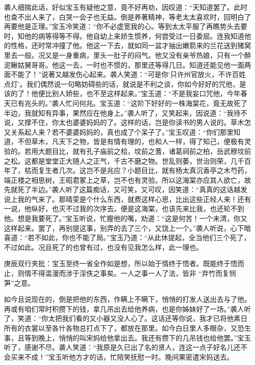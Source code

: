 \begin{parag}
    袭人细揣此话，好似宝玉有疑他之意，竟不好再劝，因叹道：“天知道罢了。此时也查不出人来了，白哭一会子也无益。倒是养著精神，等老太太喜欢时，回明白了再要他是正理。”宝玉冷笑道：“你不必虚宽我的心。等到太太平服了再瞧势头去要时，知他的病等得等不得。他自幼上来娇生惯养，何尝受过一日委屈。连我知道他的性格，还时常冲撞了他。他这一下去，就如同一盆才抽出嫩箭来的兰花送到猪窝里去一般。况又是一身重病，里头一肚子的闷气。他又没有亲爷热娘，只有一个醉泥鳅姑舅哥哥。他这一去，一时也不惯的，那里还等得几日。知道还能见他一面两面不能了！”说著又越发伤心起来。袭人笑道：“可是你‘只许州官放火，不许百姓点灯’。我们偶然说一句略妨碍些的话，就说是不利之谈，你如今好好的咒他，是该的了！他便比别人娇些，也不至这样起来。”宝玉道：“不是我妄口咒他，今年春天已有兆头的。”袭人忙问何兆。宝玉道：“这阶下好好的一株海棠花，竟无故死了半边，我就知有异事，果然应在他身上。”袭人听了，又笑起来，因说道：“我待不说，又撑不住，你太也婆婆妈妈的了。这样的话，岂是你读书的男人说的。草木怎又关系起人来？若不婆婆妈妈的，真也成了个呆子了。”宝玉叹道：“你们那里知道，不但草木，凡天下之物，皆是有情有理的，也和人一样，得了知己，便极有灵验的。若用大题目比，就有孔子庙前之桧，坟前之蓍，诸葛祠前之柏，岳武穆坟前之松。这都是堂堂正大随人之正气，千古不磨之物。世乱则萎，世治则荣，几千百年了，枯而复生者几次。这岂不是兆应？小题目比，就有杨太真沉香亭之木芍药，端正楼之相思树，王昭君冢上之草，岂不也有灵验。所以这海棠亦应其人欲亡，故先就死了半边。”袭人听了这篇痴话，又可笑，又可叹，因笑道：“真真的这话越发说上我的气来了。那晴雯是个什么东西，就费这样心思，比出这些正经人来！还有一说，他纵好，也灭不过我的次序去。便是这海棠，也该先来比我，也还轮不到他。想是我要死了。”宝玉听说，忙握他的嘴，劝道：“这是何苦！一个未清，你又这样起来。罢了，再别提这事，别弄的去了三个，又饶上一个。”袭人听说，心下暗喜道：“若不如此，你也不能了局。”宝玉乃道：“从此休提起，全当他们三个死了，不过如此。况且死了的也曾有过，也没有见我怎么样，此一理也。\begin{note}庚辰双行夹批：宝玉至终一省全作如是想，所以始于情终于悟者。既能终于悟而止，则情不得滥漫而涉于淫佚之事矣。一人之事一人了法，皆非 “弃竹而复悯笋”之意。\end{note}如今且说现在的，倒是把他的东西，作瞒上不瞒下，悄悄的打发人送出去与了他。再或有咱们常时积攒下的钱，拿几吊出去给他养病，也是你姊妹好了一场。”袭人听了，笑道：“你太把我们看的又小器又没人心了。这话还等你说，我才已将他素日所有的衣裳以至各什各物总打点下了，都放在那里。如今白日里人多眼杂，又恐生事，且等到晚上，悄悄的叫宋妈给他拿出去。我还有攒下的几吊钱也给他罢。”宝玉听了，感谢不尽。袭人笑道：“我原是久已出了名的贤人，连这一点子好名儿还不会买来不成！”宝玉听他方才的话，忙陪笑抚慰一时。晚间果密遣宋妈送去。
\end{parag}



